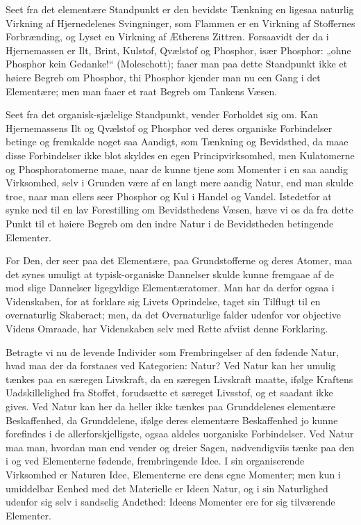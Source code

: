 \documentclass[12pt]{book}
\newcommand{\opage}[1]{\marginnote{\footnotesize\textit{[#1]}}}
\begin{document}
Seet fra det elementære Standpunkt er den bevidste Tænkning en ligesaa naturlig Virkning af
Hjernedelenes Svingninger, som Flammen er en Virkning af Stoffernes Forbrænding, og Lyset en Virkning
af Ætherens Zittren. Forsaavidt der da i Hjernemassen er Ilt, Brint, Kulstof, Qvælstof og Phosphor,
især Phosphor: „ohne Phosphor kein Gedanke!“ (Moleschott); faaer man paa dette Standpunkt ikke et
høiere Begreb om Phosphor, thi Phosphor kjender man nu een Gang i det Elementære; men man faaer et raat
Begreb om Tankens Væsen.

Seet fra det organisk-sjælelige Standpunkt, vender Forholdet sig om. Kan Hjernemassens Ilt og Qvælstof
og Phosphor ved deres organiske Forbindelser betinge og fremkalde noget saa Aandigt, som Tænkning og
Bevidsthed, da maae disse Forbindelser ikke blot skyldes en egen Principvirksomhed, men Kulatomerne og
Phosphoratomerne maae, naar de kunne tjene som Momenter i en saa aandig Virksomhed, selv i Grunden
være af en langt mere aandig Natur, end man skulde troe, naar man ellers seer Phosphor
\opage{198} og Kul i Handel og Vandel. Istedetfor at synke ned til en lav Forestilling om Bevidsthedens Væsen,
hæve vi os da fra dette Punkt til et høiere Begreb om den indre Natur i de Bevidstheden betingende
Elementer.

For Den, der seer paa det Elementære, paa Grundstofferne og deres Atomer, maa det synes umuligt at
typisk-organiske Dannelser skulde kunne fremgaae af de mod slige Dannelser ligegyldige
Elementæratomer. Man har da derfor ogsaa i Videnskaben, for at forklare sig Livets Oprindelse, taget
sin Tilflugt til en overnaturlig Skaberact; men, da det Overnaturlige falder udenfor vor objective
Videns Omraade, har Videnskaben selv med Rette afviist denne Forklaring.

Betragte vi nu de levende Individer som Frembringelser af den fødende Natur, hvad maa der da forstaaes
ved Kategorien: Natur? Ved Natur kan her umulig tænkes paa en særegen Livskraft, da en særegen
Livskraft maatte, ifølge Kraftens Uadskillelighed fra Stoffet, forudsætte et særeget Livsstof, og et
saadant ikke gives. Ved Natur kan her da heller ikke tænkes paa Grunddelenes elementære Beskaffenhed,
da Grunddelene, ifølge deres elementære Beskaffenhed jo kunne forefindes i de allerforskjelligste,
ogsaa aldeles uorganiske Forbindelser. Ved Natur maa man, hvordan man end vender og dreier Sagen,
nødvendigviis tænke paa den i og ved Elementerne fødende, frembringende Idee. I sin organiserende
Virksomhed er Naturen Idee, Elementerne ere dens egne Momenter; men kun i umiddelbar Eenhed med det
Materielle er Ideen Natur, og i sin Naturlighed udenfor sig selv i sandselig Andethed: Ideens Momenter
ere for sig tilværende Elementer.
\end{document}
